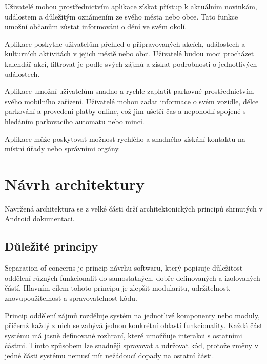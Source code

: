 Uživatelé mohou prostřednictvím aplikace získat přístup k aktuálním novinkám, událostem a důležitým oznámením ze svého města nebo obce. Tato funkce umožní občanům zůstat informováni o dění ve svém okolí.

Aplikace poskytne uživatelům přehled o připravovaných akcích, událostech a kulturních aktivitách v jejich městě nebo obci. Uživatelé budou moci procházet kalendář akcí, filtrovat je podle svých zájmů a získat podrobnosti o jednotlivých událostech.

Aplikace umožní uživatelům snadno a rychle zaplatit parkovné prostřednictvím svého mobilního zařízení. Uživatelé mohou zadat informace o svém vozidle, délce parkování a provedení platby online, což jim ušetří čas a nepohodlí spojené s hledáním parkovacího automatu nebo mincí.

Aplikace může poskytovat možnost rychlého a snadného získání kontaktu na místní úřady nebo správními orgány. %

\section{Návrh architektury}
Navržená architektura se z velké části drží architektonických principů shrnutých v Android dokumentaci. \cite{andDocArch}

\subsection*{Důležité principy}

Separation of concerns je princip návrhu softwaru, který popisuje důležitost oddělení různých funkcionalit do samostatných, dobře definovaných a izolovaných částí.
Hlavním cílem tohoto principu je zlepšit modularitu, udržitelnost, znovupoužitelnost a spravovatelnost kódu.

Princip oddělení zájmů rozděluje systém na jednotlivé komponenty nebo moduly, přičemž každý z nich se zabývá jednou konkrétní 
oblastí funkcionality. Každá část systému má jasně definované rozhraní, které umožňuje interakci s ostatními částmi. 
Tímto způsobem lze snadněji spravovat a udržovat kód, protože změny v jedné části systému nemusí mít nežádoucí dopady na ostatní části.

